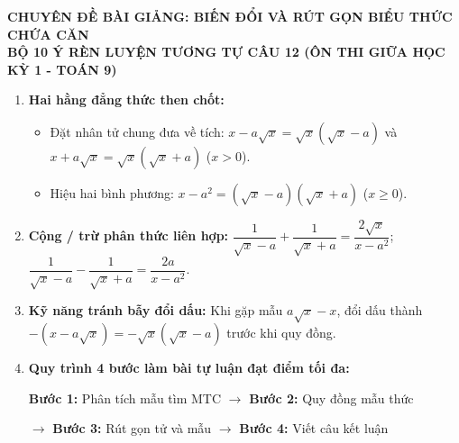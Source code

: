 \documentclass[12pt,a4paper]{article}
\begin{document}
\pagestyle{empty}

\begin{center}
  {\bfseries\large\color{mainblue} CHUYÊN ĐỀ BÀI GIẢNG: BIẾN ĐỔI VÀ RÚT GỌN BIỂU THỨC CHỨA CĂN}\\[1mm]
  {\bfseries\color{accentred} BỘ 10 Ý RÈN LUYỆN TƯƠNG TỰ CÂU 12 (ÔN THI GIỮA HỌC KỲ 1 - TOÁN 9)}
\end{center}

\vspace{-1.5mm}
\noindent{\color{mainblue}\rule{\linewidth}{1.0pt}}
\vspace{1.0mm}

\begin{lythuyetbox}
\begin{enumerate}[leftmargin=*,itemsep=1.0pt]
  \item \textbf{Hai hằng đẳng thức then chốt:}
  \begin{itemize}[itemsep=0pt]
    \item Đặt nhân tử chung đưa về tích: $x - a\sqrt{x} = \sqrt{x}(\sqrt{x} - a)$ và $x + a\sqrt{x} = \sqrt{x}(\sqrt{x} + a)$ ($x > 0$).
    \item Hiệu hai bình phương: $x - a^2 = (\sqrt{x} - a)(\sqrt{x} + a)$ ($x \ge 0$).
  \end{itemize}
  \item \textbf{Cộng / trừ phân thức liên hợp:} 
  $\dfrac{1}{\sqrt{x} - a} + \dfrac{1}{\sqrt{x} + a} = \dfrac{2\sqrt{x}}{x - a^2}$; \quad 
  $\dfrac{1}{\sqrt{x} - a} - \dfrac{1}{\sqrt{x} + a} = \dfrac{2a}{x - a^2}$.
  \item \textbf{Kỹ năng tránh bẫy đổi dấu:} Khi gặp mẫu $a\sqrt{x} - x$, đổi dấu thành $-(x - a\sqrt{x}) = -\sqrt{x}(\sqrt{x} - a)$ trước khi quy đồng.
  \item \textbf{Quy trình 4 bước làm bài tự luận đạt điểm tối đa:}\par\vspace{0.4mm}
  \centerline{\small\textbf{Bước 1:} Phân tích mẫu tìm MTC $\longrightarrow$ \textbf{Bước 2:} Quy đồng mẫu thức}
  \centerline{\small$\longrightarrow$ \textbf{Bước 3:} Rút gọn tử và mẫu $\longrightarrow$ \textbf{Bước 4:} Viết câu kết luận}
\end{enumerate}
\end{lythuyetbox}
\end{document}
